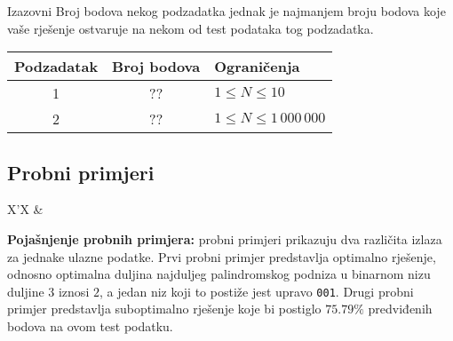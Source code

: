 \begin{statement}[
  problempoints=100,
  timelimit=1 sekunda,
  memorylimit=512 MiB,
]{Izazovni}
Broj bodova nekog podzadatka jednak je najmanjem broju bodova koje vaše rješenje
ostvaruje na nekom od test podataka tog podzadatka.

{\renewcommand{\arraystretch}{1.4}
  \setlength{\tabcolsep}{6pt}
  \begin{tabular}{ccl}
 Podzadatak & Broj bodova & Ograničenja \\ \midrule
  1 & ?? & $1 \le N \le 10$ \\
  2 & ?? & $1 \le N \le 1\,000\,000$\\
\end{tabular}}

\subsection*{Probni primjeri}
\begin{tabularx}{\textwidth}{X'X}
 &
\end{tabularx}

\textbf{Pojašnjenje probnih primjera:} probni primjeri prikazuju dva
različita izlaza za jednake ulazne podatke. Prvi probni primjer predstavlja
optimalno rješenje, odnosno optimalna duljina najduljeg palindromskog podniza
u binarnom nizu duljine $3$ iznosi $2$, a jedan niz koji to postiže jest upravo
\texttt{001}. Drugi probni primjer predstavlja suboptimalno rješenje koje
bi postiglo $75.79\%$ predviđenih bodova na ovom test podatku.

\end{statement}

